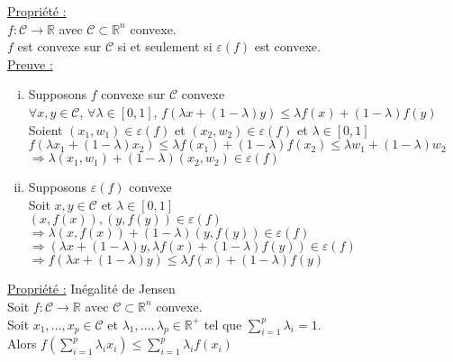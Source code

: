 \documentclass[12pt,a4paper]{article}
\begin{document}
\underline{Propriété :}\\
$f : \mathcal{C} \rightarrow \mathbb{R}$ avec $\mathcal{C} \subset \mathbb{R}^n$ convexe.\\
$f$ est convexe sur $\mathcal{C}$ si et seulement si $\varepsilon(f)$ est convexe.\\

\color{blue}
\underline{Preuve :}

\begin{enumerate}[i)]
    \item Supposons $f$ convexe sur $\mathcal{C}$ convexe\\
    $\forall x, y \in \mathcal{C}$, $\forall \lambda \in [0, 1]$, $f(\lambda x + (1 - \lambda) y) \leq \lambda f(x) + (1 - \lambda) f(y)$\\
    Soient $(x_1, w_1) \in \varepsilon(f)$ et $(x_2, w_2) \in \varepsilon(f)$ et $\lambda \in [0, 1]$\\
    $f(\lambda x_1 + (1 - \lambda) x_2) \leq \lambda f(x_1) + (1 - \lambda) f(x_2) \leq \lambda w_1 + (1 - \lambda) w_2$\\
    $\Rightarrow \lambda (x_1, w_1) + (1 - \lambda) (x_2, w_2) \in \varepsilon(f)$
    
    \item Supposons $\varepsilon(f)$ convexe\\
    Soit $x, y \in \mathcal{C}$ et $\lambda \in [0, 1]$\\
    $(x, f(x)), (y, f(y)) \in \varepsilon(f)$\\
    $\Rightarrow \lambda (x, f(x)) + (1 - \lambda) (y, f(y)) \in \varepsilon(f)$\\
    $\Rightarrow (\lambda x + (1 - \lambda) y, \lambda f(x) + (1 - \lambda) f(y)) \in \varepsilon(f)$\\
    $\Rightarrow f(\lambda x + (1 - \lambda) y) \leq \lambda f(x) + (1 - \lambda) f(y)$  
\end{enumerate}

\color{black}

\underline{Propriété :} Inégalité de Jensen\\
Soit $f : \mathcal{C} \rightarrow \mathbb{R}$ avec $\mathcal{C} \subset \mathbb{R}^n$ convexe.\\
Soit $x_1, \dots, x_p \in \mathcal{C}$ et $\lambda_1, \dots, \lambda_p \in \mathbb{R}^+$ tel que $\sum_{i=1}^p \lambda_i = 1$.\\
Alors $f(\sum_{i=1}^p \lambda_i x_i) \leq \sum_{i=1}^p \lambda_i f(x_i)$\\
\end{document}
